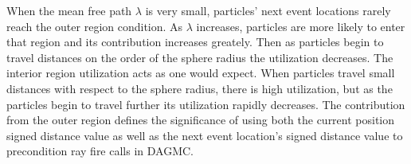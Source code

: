 When the mean free path $\lambda$ is very small, particles' next event locations
rarely reach the outer region condition. As $\lambda$ increases, particles are
more likely to enter that region and its contribution increases greately. Then
as particles begin to travel distances on the order of the sphere radius the
utilization decreases. The interior region utilization acts as one would
expect. When particles travel small distances with respect to the sphere radius,
there is high utilization, but as the particles begin to travel further its
utilization rapidly decreases. The contribution from the outer region defines the
significance of using both the current position signed distance value as well as the
next event location's signed distance value to precondition ray fire calls in DAGMC.

